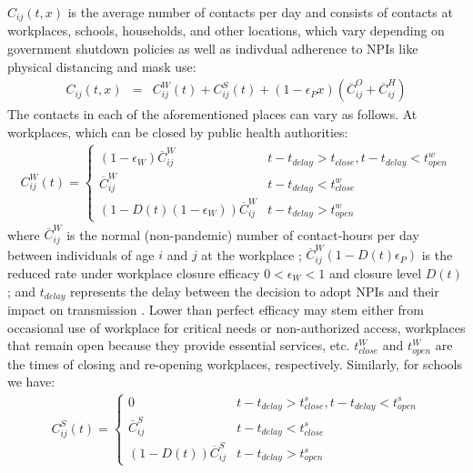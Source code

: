 \documentclass[10pt,onecolumn,twoside,lineno]{pnas-new}
\begin{document}
$C_{ij}(t,x)$ is the average number of contacts per day and consists of contacts at workplaces, schools, households, and other locations, which vary depending on government shutdown policies as well as indivdual adherence to NPIs like physical distancing and mask use: 
\begin{eqnarray}
C_{ij}(t,x) &= & C^W_{ij}(t) + C^S_{ij}(t) + (1 - \epsilon_P x ) (\overline{C}^O_{ij} + \overline{C}^H_{ij} )
\end{eqnarray}
The contacts in each of the aforementioned places can vary as follows. At workplaces, which can be closed by public health authorities: 
\begin{eqnarray}
C^W_{ij}(t) =  \left\{
\begin{array}{ll}
      (1 - \epsilon_W) \overline{C}^W_{ij} & t - t_{delay} >t_{close}, t  - t_{delay}< t^w_{open} \\ 
      \overline{C}^W_{ij} &  t - t_{delay}<t^w_{close} \\
       
       (1 - D(t)(1 - \epsilon_W)) \overline{C}^W_{ij} & t - t_{delay}> t^w_{open}
\end{array} 
\label{cw_eqn}
\right. 
\end{eqnarray}
where $\overline{C}^W_{ij}$ is the normal (non-pandemic) number of contact-hours per day between individuals of age $i$ and $j$ at the workplace \cite{zagheni2008using}; $\overline{C}^W_{ij} (1 - D(t)\epsilon_P)$ is the reduced rate under workplace closure efficacy $0 < \epsilon_W< 1$ and closure level $D(t)$; and $t_{delay}$ represents the delay between the decision to adopt NPIs and their impact on transmission \cite{li2020temporal}. Lower than perfect efficacy may stem either from occasional use of workplace for critical needs or non-authorized access, workplaces that remain open because they provide essential services, etc. $t^W_{close}$ and $t^W_{open}$ are the times of closing and re-opening workplaces, respectively. Similarly, for schools we have: 
\begin{eqnarray}
  C^S_{ij}(t) =  \left\{
\begin{array}{ll}
      0 & t - t_{delay}>t^s_{close}, t - t_{delay} < t^s_{open} \\ 
      \overline{C}^S_{ij} &  t - t_{delay}<t^s_{close} \\
       
      (1 - D(t)) \overline{C}^S_{ij} & t - t_{delay} > t^s_{open}
\end{array} 
\right. 
\label{cs_eqn}
\end{eqnarray}
\end{document}
